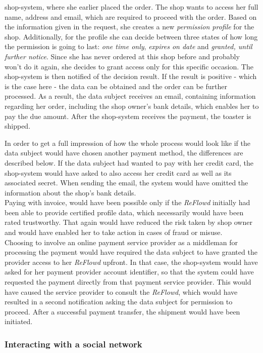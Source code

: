 \documentclass[12pt,english,a4paper,titlepage,cleardoublepage=empty,dottedtoc]{report}
\begin{document}
shop-system, where she earlier placed the order. The shop wants to
access her full name, address and email, which are required to proceed
with the order. Based on the information given in the request, she
creates a new \emph{permission profile} for the shop. Additionally, for
the profile she can decide between three states of how long the
permission is going to last: \emph{one time only}, \emph{expires on
date} and \emph{granted, until further notice}. Since she has never
ordered at this shop before and probably won't do it again, she decides
to grant access only for this specific occasion. The shop-system is then
notified of the decision result. If the result is positive - which is
the case here - the data can be obtained and the order can be further
processed. As a result, the data subject receives an email, containing
information regarding her order, including the shop owner's bank
details, which enables her to pay the due amount. After the shop-system
receives the payment, the toaster is shipped.

In order to get a full impression of how the whole process would look
like if the data subject would have chosen another payment method, the
differences are described below. If the data subject had wanted to pay
with her credit card, the shop-system would have asked to also access
her credit card as well as its associated secret. When sending the
email, the system would have omitted the information about the shop's
bank details.\\
Paying with invoice, would have been possible only if the \emph{ReFlowd}
initially had been able to provide certified profile data, which
necessarily would have been rated trustworthy. That again would have
reduced the risk taken by shop owner and would have enabled her to take
action in cases of fraud or misuse.\\
Choosing to involve an online payment service provider as a middleman
for processing the payment would have required the data subject to have
granted the provider access to her \emph{ReFlowd} upfront. In that case,
the shop-system would have asked for her payment provider account
identifier, so that the system could have requested the payment directly
from that payment service provider. This would have caused the service
provider to consult the \emph{ReFlowd}, which would have resulted in a
second notification asking the data subject for permission to proceed.
After a successful payment transfer, the shipment would have been
initiated.

\subsubsection*{Interacting with a social
network}\label{interacting-with-a-social-network}
\end{document}
